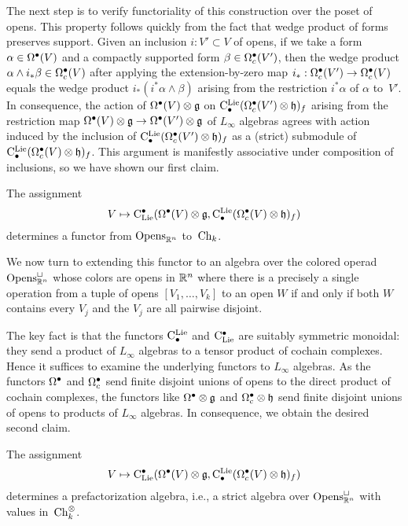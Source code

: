 \documentclass[11pt]{amsart}
\numberwithin{equation}{section}
\begin{document}
The next step is to verify functoriality of this construction over the poset of opens.
This property follows quickly from the fact that wedge product of forms preserves support.
Given an inclusion $i: V' \subset V$ of opens, if we take a form $\alpha \in \Omega^\bullet(V)$ and a compactly supported form $\beta \in \Omega^\bullet_c(V')$, then the wedge product $\alpha \wedge i_* \beta \in \Omega^\bullet_c(V)$ after applying the extension-by-zero map $i_*: \Omega^\bullet_c(V') \to \Omega^\bullet_c(V)$ equals the wedge product $i_*(i^*\alpha \wedge \beta)$ arising from the restriction $i^* \alpha$ of $\alpha$ to~$V'$.
In consequence, the action of $\Omega^\bullet(V) \otimes \mathfrak g$ on ${\rm C}^{\rm Lie}_\bullet(\Omega^\bullet_c(V') \otimes \mathfrak h)_f$ arising from the restriction map $\Omega^\bullet(V) \otimes \mathfrak g \to \Omega^\bullet(V') \otimes \mathfrak g$ of $L_\infty$ algebras agrees with action induced by the inclusion of ${\rm C}^{\rm Lie}_\bullet(\Omega^\bullet_c(V') \otimes \mathfrak h)_f$ as a (strict) submodule of~${\rm C}^{\rm Lie}_\bullet(\Omega^\bullet_c(V) \otimes \mathfrak h)_f$.
This argument is manifestly associative under composition of inclusions, so we have shown our first claim.

\begin{lmm}
The assignment
\[
V \mapsto {\rm C}_{\rm Lie}^\bullet(\Omega^\bullet(V) \otimes \mathfrak g, {\rm C}^{\rm Lie}_\bullet(\Omega^\bullet_c(V) \otimes \mathfrak h)_f)
\]
determines a functor from ${\rm Opens}_{\mathbb R^n}$ to~${\rm Ch}_k$.
\end{lmm}

We now turn to extending this functor to an algebra over the colored operad ${\rm Opens}_{\mathbb R^n}^\sqcup$ whose colors are opens in $\mathbb R^n$ where there is a precisely a single operation from a tuple of opens $[V_1,\ldots,V_k]$ to an open $W$ if and only if both $W$ contains every $V_j$ and the $V_j$ are all pairwise disjoint.

The key fact is that the functors ${\rm C}^{\rm Lie}_\bullet$ and ${\rm C}_{\rm Lie}^\bullet$ are suitably symmetric monoidal:
they send a product of $L_\infty$ algebras to a tensor product of cochain complexes.
Hence it suffices to examine the underlying functors to $L_\infty$ algebras.
As the functors $\Omega^\bullet$ and $\Omega^\bullet_c$ send finite disjoint unions of opens to the direct product of cochain complexes, 
the functors like $\Omega^\bullet \otimes \mathfrak g$ and $\Omega^\bullet_c \otimes \mathfrak h$ send finite disjoint unions of opens to products of $L_\infty$ algebras.
In consequence, we obtain the desired second claim.

\begin{lmm}
The assignment
\[
V \mapsto {\rm C}_{\rm Lie}^\bullet(\Omega^\bullet(V) \otimes \mathfrak g, {\rm C}^{\rm Lie}_\bullet(\Omega^\bullet_c(V) \otimes \mathfrak h)_f)
\]
determines a prefactorization algebra, i.e., a strict algebra over ${\rm Opens}_{\mathbb R^n}^\sqcup$ with values in~${\rm Ch}_k^\otimes$.
\end{lmm}
\end{document}
